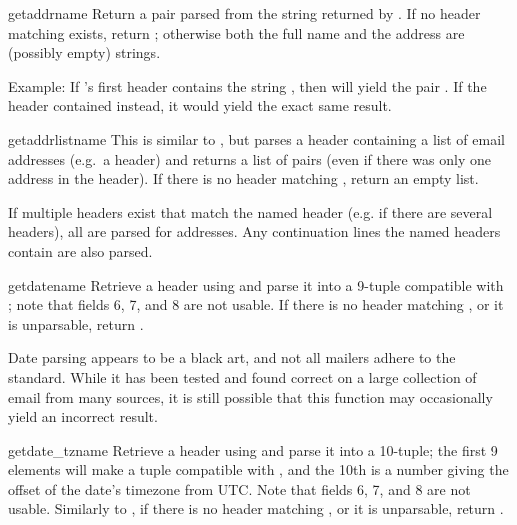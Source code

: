 \begin{methoddesc}{getaddr}{name}
Return a pair  parsed
from the string returned by .  If no
header matching  exists, return ;
otherwise both the full name and the address are (possibly empty)
strings.

Example: If 's first  header contains the string
, then
 will yield the pair
.
If the header contained
 instead, it would yield the
exact same result.
\end{methoddesc}

\begin{methoddesc}{getaddrlist}{name}
This is similar to , but parses a header
containing a list of email addresses (e.g.\ a  header) and
returns a list of  pairs
(even if there was only one address in the header).  If there is no
header matching , return an empty list.

If multiple headers exist that match the named header (e.g. if there
are several  headers), all are parsed for addresses.  Any
continuation lines the named headers contain are also parsed.
\end{methoddesc}

\begin{methoddesc}{getdate}{name}
Retrieve a header using  and parse it into a 9-tuple
compatible with ; note that fields 6, 7, and 8 
are not usable.  If there is no header matching
, or it is unparsable, return .

Date parsing appears to be a black art, and not all mailers adhere to
the standard.  While it has been tested and found correct on a large
collection of email from many sources, it is still possible that this
function may occasionally yield an incorrect result.
\end{methoddesc}

\begin{methoddesc}{getdate_tz}{name}
Retrieve a header using  and parse it into a
10-tuple; the first 9 elements will make a tuple compatible with
, and the 10th is a number giving the offset
of the date's timezone from UTC.  Note that fields 6, 7, and 8 
are not usable.  Similarly to , if
there is no header matching , or it is unparsable, return
. 
\end{methoddesc}

